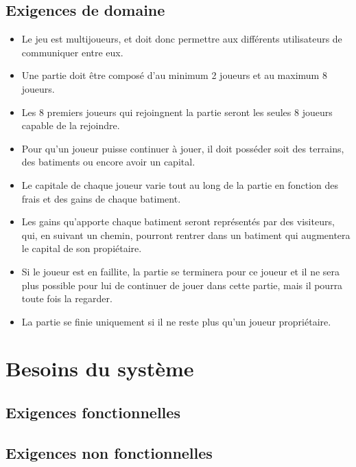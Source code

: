 \documentclass[a4paper,11pt]{report}
\begin{document}
\section{Exigences de domaine}
\begin{itemize}
 \item Le jeu est multijoueurs, et doit donc permettre aux différents utilisateurs de communiquer entre eux.
 \item Une partie doit être composé d'au minimum 2 joueurs et au maximum 8 joueurs.
 \item Les 8 premiers joueurs qui rejoingnent la partie seront les seules 8 joueurs capable de la rejoindre.
 \item Pour qu'un joueur puisse continuer à jouer, il doit posséder soit des terrains, des batiments ou encore avoir
 un capital. 
 \item Le capitale de chaque joueur varie tout au long de la partie en fonction des frais et des gains de chaque batiment.
 \item Les gains qu'apporte chaque batiment seront représentés par des visiteurs, qui, en suivant un chemin, pourront 
 rentrer dans un batiment qui augmentera le capital de son propiétaire.
 \item Si le joueur est en faillite, la partie se terminera pour ce joueur et il ne sera plus possible pour lui de
 continuer de jouer dans cette partie, mais il pourra toute fois la regarder.
 \item La partie se finie uniquement si il ne reste plus qu'un joueur propriétaire.

 \end{itemize}

\newpage
\chapter{Besoins du système}
\section{Exigences fonctionnelles}
\section{Exigences non fonctionnelles}
\end{document}
